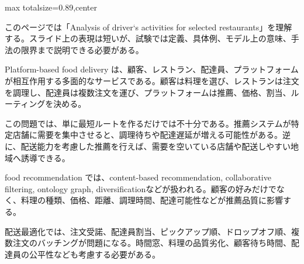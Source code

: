 \begin{minipage}[t]{0.58\textwidth}
\begin{adjustbox}{max totalsize={\textwidth}{0.89\textheight},center}
\begin{minipage}{\textwidth}\scriptsize
{}このページでは「Analysis of driver‘s activities for selected restaurants」を理解する。スライド上の表現は短いが、試験では定義、具体例、モデル上の意味、手法の限界まで説明できる必要がある。\par
Platform-based food delivery は、顧客、レストラン、配達員、プラットフォームが相互作用する多面的なサービスである。顧客は料理を選び、レストランは注文を調理し、配達員は複数注文を運び、プラットフォームは推薦、価格、割当、ルーティングを決める。\par
この問題では、単に最短ルートを作るだけでは不十分である。推薦システムが特定店舗に需要を集中させると、調理待ちや配達遅延が増える可能性がある。逆に、配送能力を考慮した推薦を行えば、需要を空いている店舗や配送しやすい地域へ誘導できる。\par
food recommendation では、content-based recommendation, collaborative filtering, ontology graph, diversificationなどが扱われる。顧客の好みだけでなく、料理の種類、価格、距離、調理時間、配達可能性などが推薦品質に影響する。\par
配送最適化では、注文受諾、配達員割当、ピックアップ順、ドロップオフ順、複数注文のバッチングが問題になる。時間窓、料理の品質劣化、顧客待ち時間、配達員の公平性なども考慮する必要がある。\par

\end{minipage}
\end{adjustbox}
\end{minipage}
